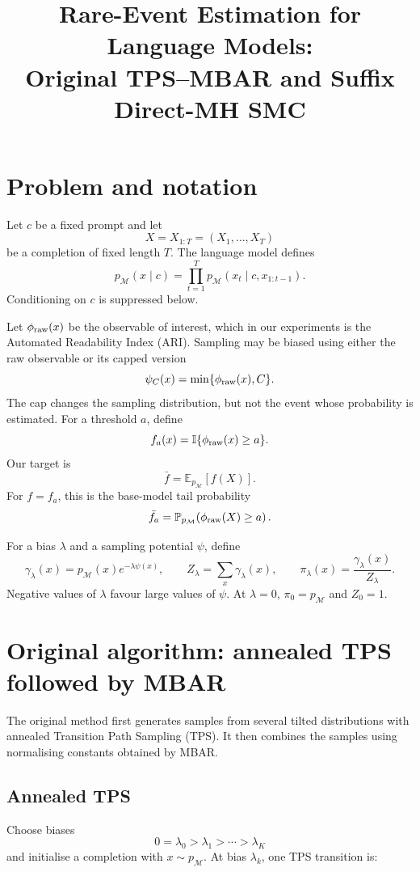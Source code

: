 \documentclass[11pt,a4paper]{article}
\title{Rare-Event Estimation for Language Models:\\
Original TPS--MBAR and Suffix Direct-MH SMC}
\author{}
\date{}
\newcommand{\pM}{p_{\mathcal M}}
\newcommand{\E}{\mathbb E}
\newcommand{\1}{\mathbb I}
\begin{document}
\maketitle

\section{Problem and notation}

Let $c$ be a fixed prompt and let
\[
X=X_{1:T}=(X_1,\ldots,X_T)
\]
be a completion of fixed length $T$. The language model defines
\[
\pM(x\mid c)
=
\prod_{t=1}^{T}\pM(x_t\mid c,x_{1:t-1}).
\]
Conditioning on $c$ is suppressed below.

Let $\phi_{\rm raw}(x)$ be the observable of interest, which in our
experiments is the Automated Readability Index (ARI). Sampling may be biased
using either the raw observable or its capped version
\[
\psi_C(x)=\min\{\phi_{\rm raw}(x),C\}.
\]
The cap changes the sampling distribution, but not the event whose probability
is estimated. For a threshold $a$, define
\[
f_a(x)=\1\{\phi_{\rm raw}(x)\geq a\}.
\]
Our target is
\[
\bar f=\E_{\pM}[f(X)].
\]
For $f=f_a$, this is the base-model tail probability
\[
\bar f_a
=
\mathbb P_{\pM}\!\left(\phi_{\rm raw}(X)\geq a\right).
\]

For a bias $\lambda$ and a sampling potential $\psi$, define
\[
\gamma_\lambda(x)=\pM(x)e^{-\lambda\psi(x)},
\qquad
Z_\lambda=\sum_x\gamma_\lambda(x),
\qquad
\pi_\lambda(x)=\frac{\gamma_\lambda(x)}{Z_\lambda}.
\]
Negative values of $\lambda$ favour large values of $\psi$. At $\lambda=0$,
$\pi_0=\pM$ and $Z_0=1$.

\section{Original algorithm: annealed TPS followed by MBAR}

The original method first generates samples from several tilted distributions
with annealed Transition Path Sampling (TPS). It then combines the samples
using normalising constants obtained by MBAR.

\subsection{Annealed TPS}

Choose biases
\[
0=\lambda_0>\lambda_1>\cdots>\lambda_K
\]
and initialise a completion with $x\sim\pM$. At bias $\lambda_k$, one TPS
transition is:
\end{document}
